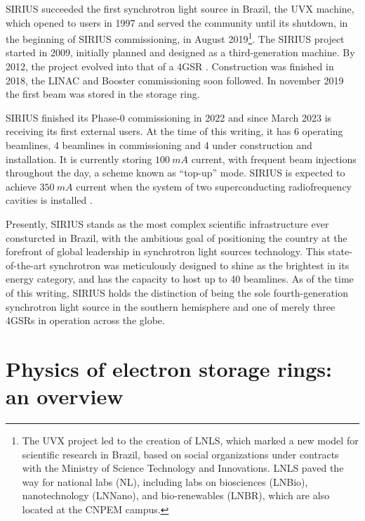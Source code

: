 SIRIUS succeeded the first synchrotron light source in Brazil, the UVX machine, which opened to users in 1997 and served the community until its shutdown, in the beginning of SIRIUS commissioning, in August 2019\footnote{The UVX project led to the creation of LNLS, which marked a new model for scientific research in Brazil, based on social organizations under contracts with the Ministry of Science Technology and Innovations. LNLS paved the way for national labs (NL), including labs on biosciences (LNBio), nanotechnology (LNNano), and bio-renewables (LNBR), which are also located at the CNPEM campus.}\cite{liu_synchrotron_2019}. The SIRIUS project started in 2009, initially planned and designed as a third-generation machine. By 2012, the project evolved into that of a 4GSR \cite{liu_synchrotron_2019}. Construction was finished in 2018, the LINAC and Booster commissioning soon followed. In november 2019 the first beam was stored in the storage ring.

SIRIUS finished its Phase-0 commissioning in 2022 and since March 2023 is receiving its first external users. At the time of this writing,  it has 6 operating beamlines, 4 beamlines in commissioning and 4 under construction and installation. It is currently storing $100~\unit{mA}$ current, with frequent beam injections throughout the day, a scheme known as ``top-up'' mode. SIRIUS is expected to achieve $350~\unit{mA}$ current when the system of two superconducting radiofrequency cavities is installed \cite{liu_status_2022,liu_status_2023}.

Presently, SIRIUS stands as the most complex scientific infrastructure ever consturcted in Brazil, with the ambitious goal of positioning the country at the forefront of global leadership in synchrotron light sources technology. This state-of-the-art synchrotron was meticulously designed to shine as the brightest in its energy category, and has the capacity to host up to 40 beamlines. As of the time of this writing, SIRIUS holds the distinction of being the sole fourth-generation synchrotron light source in the southern hemisphere and one of merely three 4GSRs in operation across the globe.

\section*{Physics of electron storage rings: an overview}

